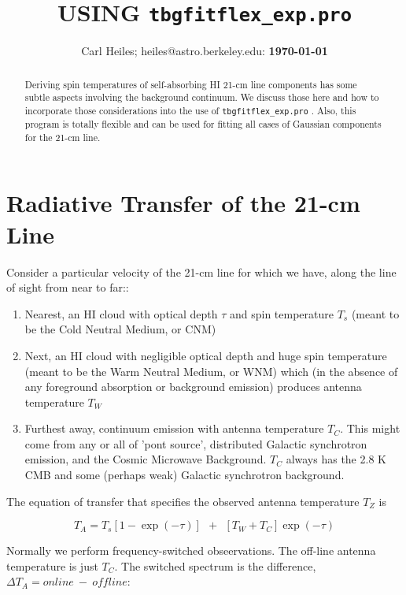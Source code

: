 \documentclass[preprint]{aastex}
\begin{document}
\title{USING {\tt tbgfitflex\_exp.pro}}
\author{Carl Heiles; heiles@astro.berkeley.edu: {\bf \today}}

\begin{abstract}
Deriving spin temperatures of self-absorbing HI 21-cm line components
has some subtle aspects involving the background continuum. We discuss
those here and how to incorporate those considerations into the use of
{\tt tbgfitflex\_exp.pro} . Also, this program is totally flexible and
can be used for fitting all cases of Gaussian components for the 21-cm
line. 
\end{abstract}

\section{Radiative Transfer of the 21-cm Line}

Consider a particular velocity of the 21-cm line for which we have,
along the line of sight from near to far:: \begin{enumerate}

\item Nearest, an HI cloud with optical depth $\tau$ and spin
  temperature $T_s$ (meant to be the Cold Neutral Medium, or CNM)

\item Next, an HI cloud with negligible optical depth and huge spin
  temperature (meant to be the Warm Neutral Medium, or WNM) which (in
  the absence of any foreground absorption or background emission)
  produces antenna temperature $T_{W}$

\item Furthest away, continuum emission with antenna temperature
  $T_C$. This might come from any or all of 'pont source', distributed
  Galactic synchrotron emission, and the Cosmic Microwave
  Background. $T_C$ always has the 2.8 K CMB and some (perhaps weak)
  Galactic synchrotron background.
\end{enumerate}

The equation of transfer that specifies the observed antenna temperature
$T_Z$ is

\begin{equation} \label{on}
T_A = T_s \left[1 - \exp(-\tau)\right]\ \ + \ \ [T_W + T_C] \exp(-\tau)
\end{equation}

Normally we perform frequency-switched obseervations. The off-line
antenna temperature is just $T_C$. The switched spectrum is the
difference, $\Delta T_A = online \ - \ offline$:
\end{document}
